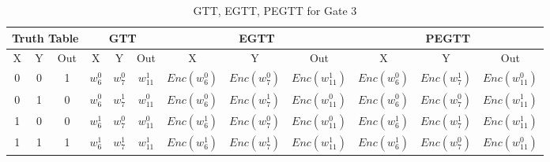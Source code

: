 \documentclass[times]{article}
\begin{document}
	\begin{table}
		\centering
		\caption{GTT, EGTT, PEGTT for Gate 3}
		\label{tab:gtt3}
		\begin{adjustbox}{width=1\textwidth}
		\begin{tabular}{|c|c|c||c|c|c||c|c|c||c|c|c|}
			\hline
			\multicolumn{3}{|c||}{Truth Table} 		& 
				\multicolumn{3}{|c||}{GTT}			& 
					\multicolumn{3}{|c||}{EGTT} 		& 
						\multicolumn{3}{|c|}{PEGTT} \\
			\hline
			\hline
			X & Y & Out	& 
				X & Y & Out	& 
					X & Y & Out	& 
						X & Y & Out	\\
			\hline
			0 & 0 & 1 	&
				$w_{6}^0$	& $w_{7}^0$	& $w_{11}^1$	& 
					$Enc(w_{6}^0)$	& $Enc(w_{7}^0)$	& $Enc(w_{11}^1)$ &
						$Enc(w_{6}^0)$	& $Enc(w_{7}^1)$	& $Enc(w_{11}^0)$ \\
			\hline
			0 & 1 & 0 	&
				$w_{6}^0$	& $w_{7}^1$	& $w_{11}^0$	& 
					$Enc(w_{6}^0)$	& $Enc(w_{7}^1)$	& $Enc(w_{11}^0)$ &
						$Enc(w_{6}^0)$	& $Enc(w_{7}^0)$	& $Enc(w_{11}^1)$ \\
			\hline
			1 & 0 & 0 	&
				$w_{6}^1$	& $w_{7}^0$	& $w_{11}^0$	& 
					$Enc(w_{6}^1)$	& $Enc(w_{7}^0)$	& $Enc(w_{11}^0)$ &
						$Enc(w_{6}^1)$	& $Enc(w_{7}^1)$	& $Enc(w_{11}^1)$ \\
			\hline
			1 & 1 & 1 	&
				$w_{6}^1$	& $w_{7}^1$	& $w_{11}^1$	& 
					$Enc(w_{6}^1)$	& $Enc(w_{7}^1)$	& $Enc(w_{11}^1)$ &
						$Enc(w_{6}^1)$	& $Enc(w_{7}^0)$	& $Enc(w_{11}^0)$ \\
			\hline
		\end{tabular}
		\end{adjustbox}
	\end{table}
\end{document}
